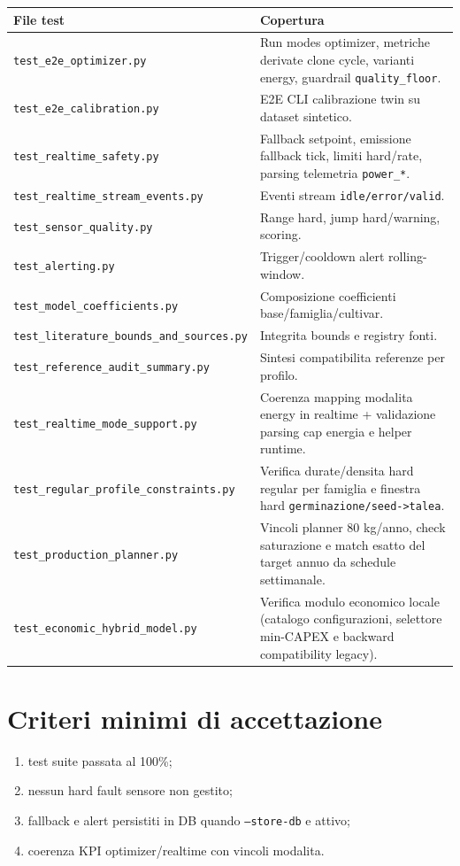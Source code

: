 ﻿\documentclass[11pt,a4paper]{report}
\begin{document}
\begin{longtable}{@{}p{5.2cm}p{8.0cm}@{}}
\toprule
File test & Copertura \\ \midrule
\texttt{test\_e2e\_optimizer.py} & Run modes optimizer, metriche derivate clone cycle, varianti energy, guardrail \texttt{quality\_floor}. \\
\texttt{test\_e2e\_calibration.py} & E2E CLI calibrazione twin su dataset sintetico. \\
\texttt{test\_realtime\_safety.py} & Fallback setpoint, emissione fallback tick, limiti hard/rate, parsing telemetria \texttt{power\_*}. \\
\texttt{test\_realtime\_stream\_events.py} & Eventi stream \texttt{idle/error/valid}. \\
\texttt{test\_sensor\_quality.py} & Range hard, jump hard/warning, scoring. \\
\texttt{test\_alerting.py} & Trigger/cooldown alert rolling-window. \\
\texttt{test\_model\_coefficients.py} & Composizione coefficienti base/famiglia/cultivar. \\
\texttt{test\_literature\_bounds\_and\_sources.py} & Integrita bounds e registry fonti. \\
\texttt{test\_reference\_audit\_summary.py} & Sintesi compatibilita referenze per profilo. \\
\texttt{test\_realtime\_mode\_support.py} & Coerenza mapping modalita energy in realtime + validazione parsing cap energia e helper runtime. \\
\texttt{test\_regular\_profile\_constraints.py} & Verifica durate/densita hard regular per famiglia e finestra hard \texttt{germinazione/seed->talea}. \\
\texttt{test\_production\_planner.py} & Vincoli planner 80 kg/anno, check saturazione e match esatto del target annuo da schedule settimanale. \\
\texttt{test\_economic\_hybrid\_model.py} & Verifica modulo economico locale (catalogo configurazioni, selettore min-CAPEX e backward compatibility legacy). \\
\bottomrule
\end{longtable}

\section{Criteri minimi di accettazione}
\begin{enumerate}
  \item test suite passata al 100\%;
  \item nessun hard fault sensore non gestito;
  \item fallback e alert persistiti in DB quando \texttt{--store-db} e attivo;
  \item coerenza KPI optimizer/realtime con vincoli modalita.
\end{enumerate}
\end{document}
